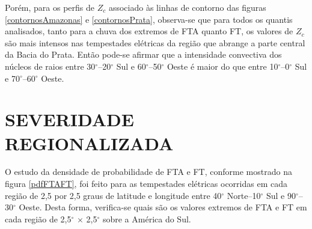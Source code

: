 Porém, para os perfis de $Z_c$ associado às linhas de contorno das figuras \ref{contornosAmazonas} e \ref{contornosPrata}, observa-se que para todos os quantis analisados, tanto para a chuva dos extremos de FTA quanto FT, os valores de $Z_c$ são mais intensos nas tempestades elétricas da região que abrange a parte central da Bacia do Prata. Então pode-se afirmar que a intensidade convectiva dos núcleos de raios entre 30$^{\circ}$--20$^{\circ}$ Sul e 60$^{\circ}$--50$^{\circ}$ Oeste é maior do que entre 10$^{\circ}$--0$^{\circ}$ Sul e 70$^{\circ}$--60$^{\circ}$ Oeste. 


\section{SEVERIDADE REGIONALIZADA}


O estudo da densidade de probabilidade de FTA e FT, conforme mostrado na figura \ref{pdfFTAFT}, foi feito para as tempestades elétricas ocorridas em cada região de 2,5 por 2,5 graus de latitude e longitude entre 40$^{\circ}$ Norte--10$^{\circ}$ Sul e 90$^{\circ}$--30$^{\circ}$ Oeste. Desta forma, verifica-se quais são os valores extremos de FTA e FT em cada região de 2,5$^{\circ}$ $\times$ 2,5$^{\circ}$ sobre a América do Sul. 



